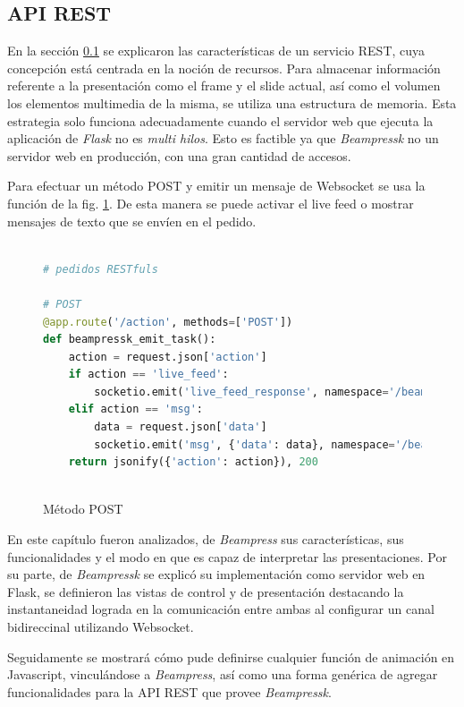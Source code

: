 		

		\subsection{API REST} %
		\label{sub:api_rest}
			En la sección \ref{sub:api_rest} se explicaron las características de un servicio REST, cuya concepción está centrada en la noción de recursos. Para almacenar información referente a la presentación como el frame y el slide actual, así como el volumen los elementos multimedia de la misma, se utiliza una estructura de memoria. Esta estrategia solo funciona adecuadamente cuando el servidor web que ejecuta la aplicación de \textit{Flask} no es \textit{multi hilos}. Esto es factible ya que \textit{Beampressk} no un servidor web en producción, con una gran cantidad de accesos.

			Para efectuar un método POST y emitir un mensaje de Websocket se usa la función de la fig. \ref{fig:post_method}. De esta manera se puede activar el live feed o mostrar mensajes de texto que se envíen en el pedido.

			\begin{figure}[htb]%
				\begin{lstlisting}[language=Python]%

# pedidos RESTfuls

# POST
@app.route('/action', methods=['POST'])
def beampressk_emit_task():
    action = request.json['action']
    if action == 'live_feed':
        socketio.emit('live_feed_response', namespace='/beampressk')
    elif action == 'msg':
        data = request.json['data']
        socketio.emit('msg', {'data': data}, namespace='/beampressk')
    return jsonify({'action': action}), 200  
  
				\end{lstlisting}
			\caption{Método POST}
			\label{fig:post_method}
			\end{figure}			

			
			

	En este capítulo fueron analizados, de \textit{Beampress} sus características, sus funcionalidades y el modo en que es capaz de interpretar las presentaciones. Por su parte, de \textit{Beampressk} se explicó su implementación como servidor web en Flask, se definieron las vistas de control y de presentación destacando la instantaneidad lograda en la comunicación entre ambas al configurar un canal bidireccinal utilizando Websocket.

	Seguidamente se mostrará cómo pude definirse cualquier función de animación en Javascript, vinculándose a \textit{Beampress}, así como una forma genérica de agregar funcionalidades para la API REST que provee \textit{Beampressk}.
		
